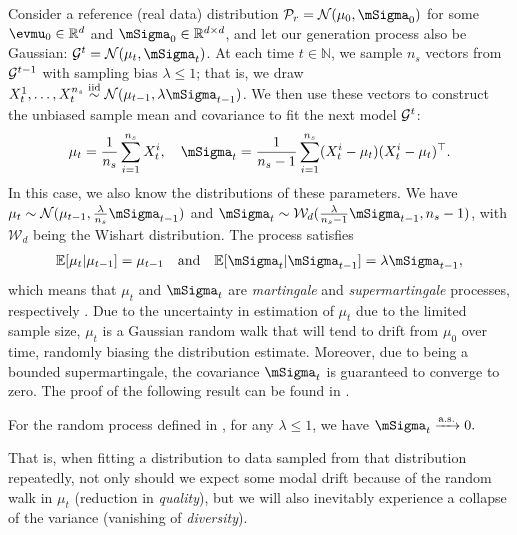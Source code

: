 \documentclass{article}
\def\bias{{\lambda}}
\begin{document}
Consider a reference (real data) distribution $\mathcal{P}_r = \mathcal{N}(\mu_0, \mSigma_0)$ for some ${\evmu}_0 \in \reals^d$ and $\vect{\mSigma}_0 \in \reals^{d \times d}$, and let our generation process also be Gaussian: $\model^t = \mathcal{N}(\mu_t, \mSigma_t)$. At each time $t \in \mathbb{N}$, we sample $n_s$ vectors from $\mathcal{G}^{t-1}$ with sampling bias $\lambda \leq 1$; that is, we draw $X_t^1, \ldots, X_t^{n_s} \overset{\mathrm{iid}}{\sim} \mathcal{N}({\mu}_{t-1}, \bias\mSigma_{t-1})$. We then use these vectors to construct the unbiased sample mean and covariance to fit the next model $\mathcal{G}^t$:
\begin{align}
    \mu_t = \frac{1}{n_s} \sum_{i=1}^{n_s} X_t^i,
    \quad
    \mSigma_t = \frac{1}{n_s - 1} \sum_{i=1}^{n_s} (X_t^i - \mu_t) 
    (X_t^i - \mu_t)^\top.
    \label{eq:mu-Sigma-process}
\end{align}
In this case, we also know the distributions of these parameters. We have $\mu_t \sim \mathcal{N}(\mu_{t-1}, \frac{\bias}{n_s}\mSigma_{t-1})$ and $\mSigma_{t} \sim \mathcal{W}_d(\frac{\bias}{n_s - 1} \mSigma_{t-1},n_s-1)$, with $\mathcal{W}_d$ being the Wishart distribution. The process satisfies
\begin{align}
    \mathbb{E}[\mu_t | \mu_{t-1}] = \mu_{t-1}
    \quad\text{and}\quad
    \mathbb{E}[\mSigma_t | \mSigma_{t-1}] = \bias\mSigma_{t-1},
\end{align}
which means that $\mu_t$ and $\mSigma_t$ are {\em martingale} and {\em supermartingale} processes, respectively \cite{williams1991probability}. 
Due to the uncertainty in estimation of $\mu_t$ due to the limited sample size, $\mu_t$ is a Gaussian random walk that will tend to drift from $\mu_0$ over time, randomly biasing the distribution estimate. 
Moreover, due to being a bounded supermartingale, the covariance $\mSigma_t$ is guaranteed to converge to zero. 
The proof of the following result can be found in .
\begin{proposition*}
    \label{prop:martingale}
    For the random process defined in , for any $\bias \leq 1$, we have $\mSigma_t \xrightarrow{\mathrm{a.s.}} 0.$
\end{proposition*}
That is, when fitting a distribution to data sampled from that distribution repeatedly, not only should we expect some modal drift because of the random walk in $\mu_t$ (reduction in \emph{quality}), but we will also inevitably experience a collapse of the variance (vanishing of \emph{diversity}).
\end{document}
